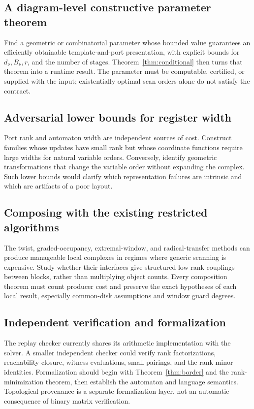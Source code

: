 \documentclass[11pt,letterpaper]{article}
\theoremstyle{definition}
\theoremstyle{remark}
\numberwithin{equation}{section}
\begin{document}
\subsection{A diagram-level constructive parameter theorem}
Find a geometric or combinatorial parameter whose bounded value guarantees
an efficiently obtainable template-and-port presentation, with explicit
bounds for $d_\nu,B_\nu,r$, and the number of stages. Theorem~\ref{thm:conditional}
then turns that theorem into a runtime result. The parameter must be
computable, certified, or supplied with the input; existentially optimal
scan orders alone do not satisfy the contract.

\subsection{Adversarial lower bounds for register width}
Port rank and automaton width are independent sources of cost. Construct
families whose updates have small rank but whose coordinate functions
require large widths for natural variable orders. Conversely, identify
geometric transformations that change the variable order without
expanding the complex. Such lower bounds would clarify which representation
failures are intrinsic and which are artifacts of a poor layout.

\subsection{Composing with the existing restricted algorithms}
The twist, graded-occupancy, extremal-window, and radical-transfer methods
can produce manageable local complexes in regimes where generic scanning
is expensive. Study whether their interfaces give structured low-rank
couplings between blocks, rather than multiplying object counts. Every
composition theorem must count producer cost and preserve the exact
hypotheses of each local result, especially common-disk assumptions and
window guard degrees.

\subsection{Independent verification and formalization}
The replay checker currently shares its arithmetic implementation with
the solver. A smaller independent checker could verify rank factorizations,
reachability closure, witness evaluations, small pairings, and the rank
minor identities. Formalization should begin with Theorem~\ref{thm:border}
and the rank-minimization theorem, then establish the automaton and
language semantics. Topological provenance is a separate formalization
layer, not an automatic consequence of binary matrix verification.
\end{document}
